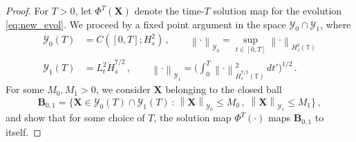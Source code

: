 \documentclass[11pt,reqno]{amsart}
\newcommand{\T}{\mathbb{T}}
\newcommand{\X}{\bm{X}}
\newcommand{\norm}[1]{\left\lVert #1 \right\rVert}
\newcommand{\mc}[1]{\mathcal{#1}}
\numberwithin{equation}{section}
\theoremstyle{definition}
\begin{document}
\begin{proof}
For $T>0$, let $\Phi^T(\X)$ denote the time-$T$ solution map for the evolution \eqref{eq:new_evol}. We proceed by a fixed point argument in the space $\mc{Y}_0\cap\mc{Y}_1$, where 
  \begin{equation}
  \begin{aligned}
    \mc{Y}_0(T) &= C([0,T];H^2_s)\,, \qquad \norm{\cdot}_{\mc{Y}_0} = \sup_{t\in[0,T]}\norm{\cdot}_{H^2_s(\T)}\\
    \mc{Y}_1(T) &= L^2_t\dot H^{7/2}_s\,, \qquad \norm{\cdot}_{\mc{Y}_1} = \bigg(\int_0^T\norm{\cdot}_{\dot H^{7/2}_s(\T)}^2\,dt'\bigg)^{1/2}\,.
  \end{aligned}
  \end{equation}
For some $M_0,M_1>0$, we consider $\X$ belonging to the closed ball
  \begin{equation}
    {\bm B}_{0,1} = \{ \X\in \mc{Y}_0(T)\cap\mc{Y}_1(T) \,:\, \norm{\X}_{\mc{Y}_0}\le M_0\,, \; \norm{\X}_{\mc{Y}_1}\le M_1 \}\,, 
  \end{equation}
and show that for some choice of $T$, the solution map $\Phi^T(\cdot)$ maps ${\bm B}_{0,1}$ to itself.



\end{proof}
\end{document}
